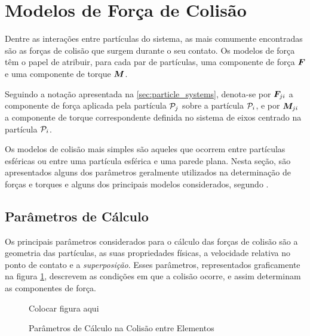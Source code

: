 \section{Modelos de Força de Colisão} \label{sec:collision_force_models}

Dentre as interações entre partículas do sistema, as mais comumente encontradas são as forças de colisão que surgem durante o seu contato. Os modelos de força têm o papel de atribuir, para cada par de partículas, uma componente de força \(\bm{F}\) e uma componente de torque \(\bm{M}\).

Seguindo a notação apresentada na \autoref{sec:particle_systems}, denota-se por \({\bm{F}}_{j i}\) a componente de força aplicada pela partícula \({\mathcal{P}}_{j}\) sobre a partícula \({\mathcal{P}}_{i}\), e por \({\bm{M}}_{j i}\) a componente de torque correspondente definida no sistema de eixos centrado na partícula \({\mathcal{P}}_{i}\).

Os modelos de colisão mais simples são aqueles que ocorrem entre partículas esféricas ou entre uma partícula esférica e uma parede plana. Nesta seção, são apresentados alguns dos parâmetros geralmente utilizados na determinação de forças e torques e alguns dos principais modelos considerados, segundo . 

\subsection{Parâmetros de Cálculo} \label{subsec:collision_parameters}

Os principais parâmetros considerados para o cálculo das forças de colisão são a geometria das partículas, as suas propriedades físicas, a velocidade relativa no ponto de contato e a \textit{superposição}. Esses parâmetros, representados graficamente na figura \ref{fig:collision_parameters}, descrevem as condições em que a colisão ocorre, e assim determinam as componentes de força.

\begin{figure}[h]
	\caption{Parâmetros de Cálculo na Colisão entre Elementos}
	\begin{center}
		\alert{Colocar figura aqui}
	\end{center}
	\label{fig:collision_parameters}
\end{figure}

